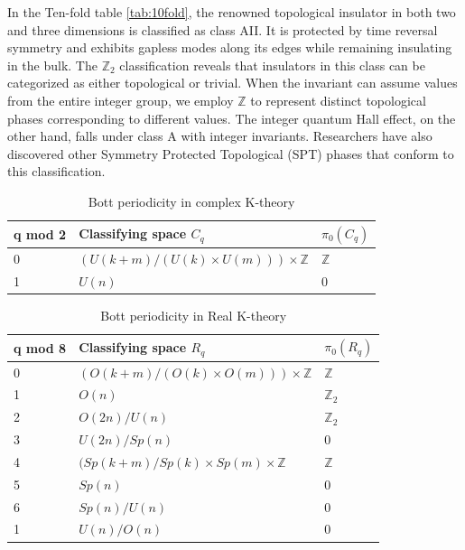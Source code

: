 In the Ten-fold table \ref{tab:10fold}, the renowned topological insulator in both two and three dimensions is classified as class AII. It is protected by time reversal symmetry and exhibits gapless modes along its edges while remaining insulating in the bulk. The $\mathbb{Z}_2$ classification reveals that insulators in this class can be categorized as either topological or trivial. When the invariant can assume values from the entire integer group, we employ $\mathbb{Z}$ to represent distinct topological phases corresponding to different values. The integer quantum Hall effect, on the other hand, falls under class A with integer invariants. Researchers have also discovered other Symmetry Protected Topological (SPT) phases that conform to this classification.


\begin{table}[h]
\renewcommand{\arraystretch}{1.5}
\caption{Bott periodicity in complex K-theory}
\label{tab:bottC}
\begin{tabular}{l|l|l}
\hline
q mod 2 & Classifying space $C_q$  & $\pi_0(C_q)$ \\\hline
0       & $(U(k+m)/(U(k)\times U(m)))\times \mathbb{Z}$ & $\mathbb{Z}$   \\
1       & $U(n)$   & 0                        \\\hline
\end{tabular}
\end{table}

\begin{table}[]
\renewcommand{\arraystretch}{1.5}
\caption{Bott periodicity in Real K-theory}
\label{tab:bottR}
\begin{tabular}{l|l|l}
\hline
q mod 8 & Classifying space $R_q$  & $\pi_0(R_q)$ \\\hline
0       & $(O(k+m)/(O(k)\times O(m)))\times \mathbb{Z}$ & $\mathbb{Z}$   \\
1       & $O(n)$   & $\mathbb{Z}_2$     \\
2       & $O(2n)/U(n)$   & $\mathbb{Z}_2$     \\
3       & $U(2n)/Sp(n)$   & 0   \\
4       & $(Sp(k+m)/Sp(k)\times Sp(m)\times\mathbb{Z}$   & $\mathbb{Z}$     \\
5       & $Sp(n)$   & 0     \\
6       & $Sp(n)/U(n)$   & 0     \\
1       & $U(n)/O(n)$   & 0    \\\hline

\end{tabular}
\end{table}


